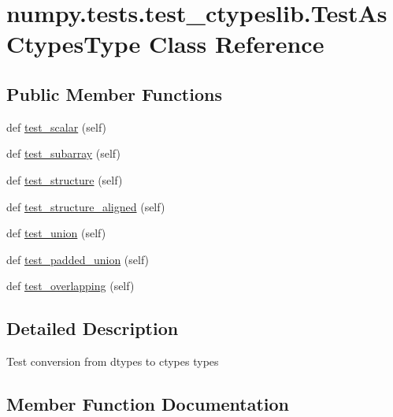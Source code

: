\hypertarget{classnumpy_1_1tests_1_1test__ctypeslib_1_1TestAsCtypesType}{}\section{numpy.\+tests.\+test\+\_\+ctypeslib.\+Test\+As\+Ctypes\+Type Class Reference}
\label{classnumpy_1_1tests_1_1test__ctypeslib_1_1TestAsCtypesType}
\subsection*{Public Member Functions}
\begin{DoxyCompactItemize}
\item 
def \hyperlink{classnumpy_1_1tests_1_1test__ctypeslib_1_1TestAsCtypesType_a27902ca3b891ca57fff7e45cc934bfab}{test\+\_\+scalar} (self)
\item 
def \hyperlink{classnumpy_1_1tests_1_1test__ctypeslib_1_1TestAsCtypesType_acf54503d038d1566ceb06b8148b3a782}{test\+\_\+subarray} (self)
\item 
def \hyperlink{classnumpy_1_1tests_1_1test__ctypeslib_1_1TestAsCtypesType_a429f77bd13e1e3bfaba5c4677824d520}{test\+\_\+structure} (self)
\item 
def \hyperlink{classnumpy_1_1tests_1_1test__ctypeslib_1_1TestAsCtypesType_a549f723812146cbfbf7138547718e968}{test\+\_\+structure\+\_\+aligned} (self)
\item 
def \hyperlink{classnumpy_1_1tests_1_1test__ctypeslib_1_1TestAsCtypesType_ad7ec40c8858ea08efd094b607b26ae56}{test\+\_\+union} (self)
\item 
def \hyperlink{classnumpy_1_1tests_1_1test__ctypeslib_1_1TestAsCtypesType_ae2f1b9d2d0ff9bc469a04ddf9e6191f4}{test\+\_\+padded\+\_\+union} (self)
\item 
def \hyperlink{classnumpy_1_1tests_1_1test__ctypeslib_1_1TestAsCtypesType_a99012859ecff3936c56edf1bf0bd1ed6}{test\+\_\+overlapping} (self)
\end{DoxyCompactItemize}


\subsection{Detailed Description}
\begin{DoxyVerb}Test conversion from dtypes to ctypes types \end{DoxyVerb}
 

\subsection{Member Function Documentation}
\mbox{\label{classnumpy_1_1tests_1_1test__ctypeslib_1_1TestAsCtypesType_a99012859ecff3936c56edf1bf0bd1ed6}} 
